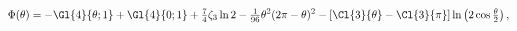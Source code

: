 \begin{equation}
\Phi(\theta) = -\Gl{4}{\theta; 1} + \Gl{4}{0; 1}
+\tfrac{7}{4}\zeta_3\ln{2} - \tfrac{1}{96}\theta^2(2\pi-\theta)^2
-\left[\Cl{3}{\theta}-\Cl{3}{\pi}\right]
\ln\left(2\cos\tfrac{\theta}{2}\right) ,
\end{equation}

